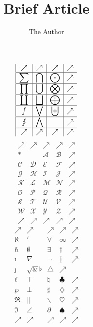 \bigodot\documentclass[11pt]{article}
\title{Brief Article}
\author{The Author}
\newif\ifpdf
\begin{document}
\ifpdf
\DeclareGraphicsExtensions{.pdf, .jpg, .tif}
\else
{}
\fi

\maketitle

$$\displaystyle
\begin{array}{|c|c|c|c}
\displaystyle\nearrow &
\displaystyle\nearrow &
\displaystyle\nearrow &
\displaystyle\nearrow \\\hline
\displaystyle\sum & \displaystyle\bigcap & \displaystyle\bigodot  &\displaystyle\nearrow\\\hline
\displaystyle\prod & \displaystyle\bigcup & \displaystyle\bigotimes  &\displaystyle\nearrow\\\hline
\displaystyle\coprod & \displaystyle\bigsqcup & \displaystyle\bigoplus  &\displaystyle\nearrow\\\hline
\int & \displaystyle\bigvee & \displaystyle\biguplus  &\displaystyle\nearrow\\\hline
\oint & \displaystyle\bigwedge & \displaystyle &\displaystyle\nearrow\\\hline
\displaystyle\nearrow &
\displaystyle\nearrow &
\displaystyle\nearrow &
\displaystyle\nearrow
\end{array}
$$
\newpage
$$
\begin{array}{|c|c|c|c|c}
\nearrow &
\nearrow &
\nearrow &
\nearrow &
\nearrow \\\hline
*& &\mathcal A&\mathcal B&\nearrow\\\hline
\mathcal C&\mathcal D&\mathcal E&\mathcal F&\nearrow\\\hline
\mathcal G&\mathcal H&\mathcal I&\mathcal J&\nearrow\\\hline
\mathcal K&\mathcal L&\mathcal M&\mathcal N&\nearrow\\\hline
\mathcal O&\mathcal P&\mathcal Q&\mathcal R&\nearrow\\\hline
\mathcal S&\mathcal T&\mathcal U&\mathcal V&\nearrow\\\hline
\mathcal W&\mathcal X&\mathcal Y&\mathcal Z&\nearrow\\\hline
\nearrow &
\nearrow &
\nearrow &
\nearrow &
\nearrow
\end{array}
$$
\newpage
$$
\begin{array}{|c|c|c|c|c}
\nearrow &
\nearrow &
\nearrow &
\nearrow &
\nearrow \\\hline
\aleph&\prime&\forall&\infty& \nearrow\\\hline
\hbar&\emptyset&\exists&\dag& \nearrow\\\hline
\imath&\nabla&\neg&\ddagger& \nearrow\\\hline
\jmath&\surd&\flat&\triangle& \nearrow\\\hline
\ell&\top&\natural&\clubsuit& \nearrow\\\hline
\wp&\bot&\sharp&\diamondsuit& \nearrow\\\hline
\Re&\|&\backslash&\heartsuit& \nearrow\\\hline
\Im&\angle&\partial&\spadesuit& \nearrow\\\hline
\nearrow &
\nearrow &
\nearrow &
\nearrow &
\nearrow
\end{array}
$$
\end{document}
